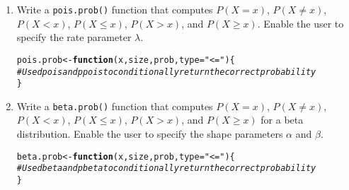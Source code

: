 \documentclass{article}\usepackage[]{graphicx}\usepackage[]{xcolor}
\makeatletter
\newcommand{\hlsng}[1]{\textcolor[rgb]{0.192,0.494,0.8}{#1}}%
\newcommand{\hlcom}[1]{\textcolor[rgb]{0.678,0.584,0.686}{\textit{#1}}}%
\newcommand{\hldef}[1]{\textcolor[rgb]{0.345,0.345,0.345}{#1}}%
\newcommand{\hlkwa}[1]{\textcolor[rgb]{0.161,0.373,0.58}{\textbf{#1}}}%
\newcommand{\hlkwb}[1]{\textcolor[rgb]{0.69,0.353,0.396}{#1}}%
\newcommand{\hlkwc}[1]{\textcolor[rgb]{0.333,0.667,0.333}{#1}}%
\newenvironment{kframe}{%
 \def\at@end@of@kframe{}%
 \ifinner\ifhmode%
  \def\at@end@of@kframe{\end{minipage}}%
  \begin{minipage}{\columnwidth}%
 \fi\fi%
 \def\FrameCommand##1{\hskip\@totalleftmargin \hskip-\fboxsep
 \colorbox{shadecolor}{##1}\hskip-\fboxsep
     \hskip-\linewidth \hskip-\@totalleftmargin \hskip\columnwidth}%
 \MakeFramed {\advance\hsize-\width
   \@totalleftmargin\z@ \linewidth\hsize
   \@setminipage}}%
 {\par\unskip\endMakeFramed%
 \at@end@of@kframe}
\newenvironment{knitrout}{}{} %
\makeatother
\begin{document}
  \begin{enumerate}
    \item Write a \texttt{pois.prob()} function that computes $P(X=x)$, 
    $P(X \neq x)$, $P(X<x)$, $P(X \leq x)$, $P(X > x)$, and $P(X \geq x).$ Enable the user to specify the rate parameter $\lambda$.
\begin{knitrout}\scriptsize
{}\color{fgcolor}\begin{kframe}
\begin{alltt}
\hldef{pois.prob} \hlkwb{<-} \hlkwa{function}\hldef{(}\hlkwc{x}\hldef{,} \hlkwc{size}\hldef{,} \hlkwc{prob}\hldef{,} \hlkwc{type}\hldef{=}\hlsng{"<="}\hldef{)\{}
  \hlcom{# Use dpois and ppois to conditionally return the correct probability}
\hldef{\}}
\end{alltt}
\end{kframe}
\end{knitrout}
    \item Write a \texttt{beta.prob()} function that computes $P(X=x)$, 
    $P(X \neq x)$, $P(X<x)$, $P(X \leq x)$, $P(X > x)$, and $P(X \geq x)$
    for a beta distribution. Enable the user to specify the shape parameters
    $\alpha$ and $\beta$.
\begin{knitrout}\scriptsize
{}\color{fgcolor}\begin{kframe}
\begin{alltt}
\hldef{beta.prob} \hlkwb{<-} \hlkwa{function}\hldef{(}\hlkwc{x}\hldef{,} \hlkwc{size}\hldef{,} \hlkwc{prob}\hldef{,} \hlkwc{type}\hldef{=}\hlsng{"<="}\hldef{)\{}
  \hlcom{# Use dbeta and pbeta to conditionally return the correct probability}
\hldef{\}}
\end{alltt}
\end{kframe}
\end{knitrout}
\end{enumerate}

\end{document}
